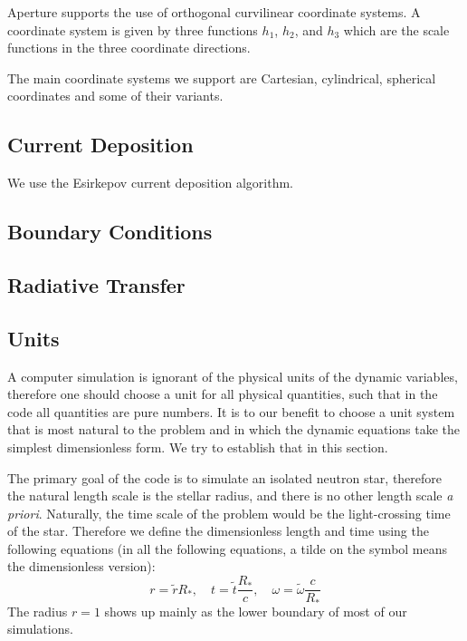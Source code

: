 Aperture supports the use of orthogonal curvilinear coordinate
systems. A coordinate system is given by three functions $h_1$, $h_2$,
and $h_3$ which are the scale functions in the three coordinate
directions.

The main coordinate systems we support are Cartesian, cylindrical,
spherical coordinates and some of their variants.

\subsection{Current Deposition}
\label{sec:charge-cons-curr}

We use the Esirkepov current deposition algorithm.

\subsection{Boundary Conditions}
\label{sec:boundary-conditions}

\subsection{Radiative Transfer}
\label{sec:radiative-transfer}

\subsection{Units}
\label{sec:pic-units}

A computer simulation is ignorant of the physical units of the dynamic
variables, therefore one should choose a unit for all physical quantities, such
that in the code all quantities are pure numbers. It is to our benefit to choose
a unit system that is most natural to the problem and in which the dynamic
equations take the simplest dimensionless form. We try to establish that in this
section.

The primary goal of the code is to simulate an isolated neutron star, therefore
the natural length scale is the stellar radius, and there is no other length
scale {\it a priori}. Naturally, the time scale of the problem would be the
light-crossing time of the star. Therefore we define the dimensionless length
and time using the following equations (in all the following equations, a tilde
on the symbol means the dimensionless version):
\begin{equation}
  r = \tilde{r}R_{*},\quad t = \tilde{t}\frac{R_{*}}{c},\quad \omega = \tilde{\omega}\frac{c}{R_{*}}
\end{equation}
The radius $r = 1$ shows up mainly as the lower boundary of most of our
simulations.

